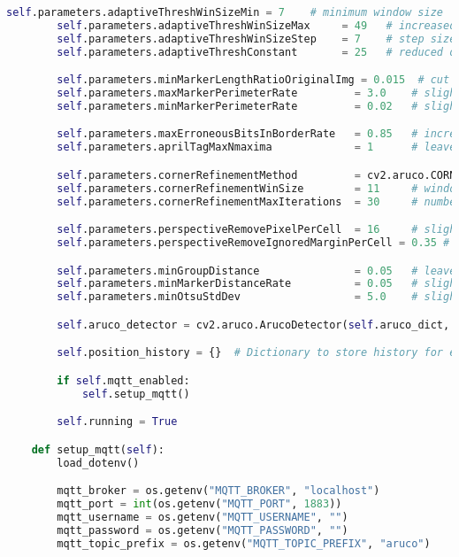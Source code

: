 \begin{lstlisting}[language=Python]
        self.parameters.adaptiveThreshWinSizeMin = 7    # minimum window size
        self.parameters.adaptiveThreshWinSizeMax     = 49   # increased window for distant tags
        self.parameters.adaptiveThreshWinSizeStep    = 7    # step size for change
        self.parameters.adaptiveThreshConstant       = 25   # reduced offset (less aggressive)

        self.parameters.minMarkerLengthRatioOriginalImg = 0.015  # cut off small artifacts
        self.parameters.maxMarkerPerimeterRate         = 3.0    # slightly more to capture "large" ones up close
        self.parameters.minMarkerPerimeterRate         = 0.02   # slightly higher to filter out very small ones

        self.parameters.maxErroneousBitsInBorderRate   = 0.85   # increase border accuracy
        self.parameters.aprilTagMaxNmaxima             = 1      # leave the first maximum

        self.parameters.cornerRefinementMethod         = cv2.aruco.CORNER_REFINE_SUBPIX
        self.parameters.cornerRefinementWinSize        = 11     # window for subpixel
        self.parameters.cornerRefinementMaxIterations  = 30     # number of iterations

        self.parameters.perspectiveRemovePixelPerCell  = 16     # slightly more pixels per cell
        self.parameters.perspectiveRemoveIgnoredMarginPerCell = 0.35 # less "white" border

        self.parameters.minGroupDistance               = 0.05   # leave default
        self.parameters.minMarkerDistanceRate          = 0.05   # slightly higher
        self.parameters.minOtsuStdDev                  = 5.0    # slightly lower so binarization skips less

        self.aruco_detector = cv2.aruco.ArucoDetector(self.aruco_dict, self.parameters)

        self.position_history = {}  # Dictionary to store history for each tag

        if self.mqtt_enabled:
            self.setup_mqtt()

        self.running = True

    def setup_mqtt(self):
        load_dotenv()

        mqtt_broker = os.getenv("MQTT_BROKER", "localhost")
        mqtt_port = int(os.getenv("MQTT_PORT", 1883))
        mqtt_username = os.getenv("MQTT_USERNAME", "")
        mqtt_password = os.getenv("MQTT_PASSWORD", "")
        mqtt_topic_prefix = os.getenv("MQTT_TOPIC_PREFIX", "aruco")


\end{lstlisting}

